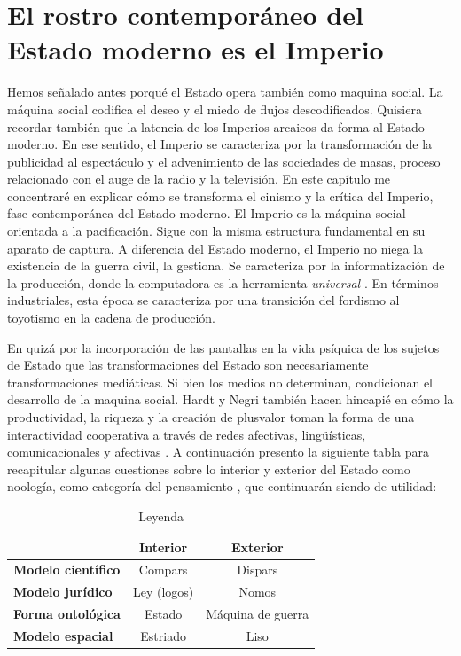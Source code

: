 \chapter{El rostro contemporáneo del Estado moderno es el Imperio}
\label{cha:el-rostro}

Hemos señalado antes porqué el Estado opera también como maquina social. La máquina social codifica el deseo y el miedo de flujos descodificados. Quisiera recordar también que la latencia de los Imperios arcaicos da forma al Estado moderno. En ese sentido, el Imperio se caracteriza por la transformación de la publicidad al espectáculo y el advenimiento de las sociedades de masas, proceso relacionado con el auge de la radio y la televisión. En este capítulo me concentraré en explicar cómo se transforma el cinismo y la crítica del Imperio, fase contemporánea del Estado moderno. El Imperio es la máquina social orientada a la pacificación. Sigue con la misma estructura fundamental en su aparato de captura. A diferencia del Estado moderno, el Imperio no niega la existencia de la guerra civil, la gestiona. Se caracteriza por la informatización de la producción, donde la computadora es la herramienta \emph{universal} \autocite{hardtImperio2005} . En términos industriales, esta época se caracteriza por una transición del fordismo al toyotismo en la cadena de producción.

En quizá por la incorporación de las pantallas en la vida psíquica de los sujetos de Estado que las transformaciones del Estado son necesariamente transformaciones mediáticas. Si bien los medios no determinan, condicionan el desarrollo de la maquina social. Hardt y Negri también hacen hincapié en cómo la productividad, la riqueza y la creación de plusvalor toman la forma de una interactividad cooperativa a través de redes afectivas, lingüísticas, comunicacionales y afectivas \autocite[pp.~58,108]{hardtImperio2005}. A continuación presento la siguiente tabla para recapitular algunas cuestiones sobre lo interior y exterior del Estado como noología, como categoría del pensamiento \autocite{deleuzeMilMesetasCapitalismo2002}, que continuarán siendo de utilidad:

\begin{table}[htb]
  \caption{Leyenda} %
  \label{tab:tablename}
  \centering
  \begin{tabular}{lcc}
    \toprule
    & \textbf{Interior} & \textbf{Exterior}\\
    \midrule
    \textbf{Modelo científico} & Compars & Dispars\\
    \textbf{Modelo jurídico} & Ley (logos) & Nomos\\
    \textbf{Forma ontológica} & Estado & Máquina de guerra\\
    \textbf{Modelo espacial} & Estriado & Liso\\
    \bottomrule
  \end{tabular}
\end{table}


